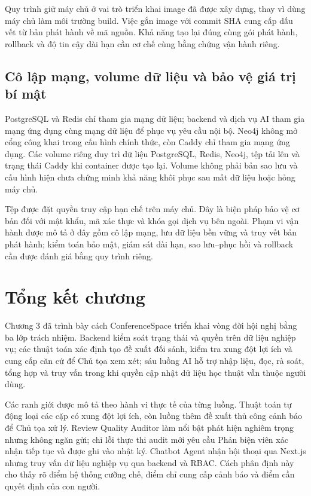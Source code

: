 Quy trình giữ máy chủ ở vai trò triển khai image đã được xây dựng, thay vì dùng máy chủ làm môi trường build. Việc gắn image với commit SHA cung cấp dấu vết từ bản phát hành về mã nguồn. Khả năng tạo lại đúng cùng gói phát hành, rollback và độ tin cậy dài hạn cần cơ chế cùng bằng chứng vận hành riêng.

\subsection{Cô lập mạng, volume dữ liệu và bảo vệ giá trị bí mật}

PostgreSQL và Redis chỉ tham gia mạng dữ liệu; backend và dịch vụ AI tham gia mạng ứng dụng cùng mạng dữ liệu để phục vụ yêu cầu nội bộ. Neo4j không mở cổng công khai trong cấu hình chính thức, còn Caddy chỉ tham gia mạng ứng dụng. Các volume riêng duy trì dữ liệu PostgreSQL, Redis, Neo4j, tệp tải lên và trạng thái Caddy khi container được tạo lại. Volume không phải bản sao lưu và cấu hình hiện chưa chứng minh khả năng khôi phục sau mất dữ liệu hoặc hỏng máy chủ.

Tệp  được đặt quyền truy cập hạn chế trên máy chủ. Đây là biện pháp bảo vệ cơ bản đối với mật khẩu, mã xác thực và khóa gọi dịch vụ bên ngoài. Phạm vi vận hành được mô tả ở đây gồm cô lập mạng, lưu dữ liệu bền vững và truy vết bản phát hành; kiểm toán bảo mật, giám sát dài hạn, sao lưu--phục hồi và rollback cần được đánh giá bằng quy trình riêng.

\section{Tổng kết chương}

Chương 3 đã trình bày cách ConferenceSpace triển khai vòng đời hội nghị bằng ba lớp trách nhiệm. Backend kiểm soát trạng thái và quyền trên dữ liệu nghiệp vụ; các thuật toán xác định tạo đề xuất đối sánh, kiểm tra xung đột lợi ích và cung cấp căn cứ để Chủ tọa xem xét; sáu luồng AI hỗ trợ nhập liệu, đọc, rà soát, tổng hợp và truy vấn trong khi quyền cập nhật dữ liệu học thuật vẫn thuộc người dùng.

Các ranh giới được mô tả theo hành vi thực tế của từng luồng. Thuật toán tự động loại các cặp có xung đột lợi ích, còn luồng thêm đề xuất thủ công cảnh báo để Chủ tọa xử lý. Review Quality Auditor làm nổi bật phát hiện nghiêm trọng nhưng không ngăn gửi; chỉ lỗi thực thi audit mới yêu cầu Phản biện viên xác nhận tiếp tục và được ghi vào nhật ký. Chatbot Agent nhận hội thoại qua Next.js nhưng truy vấn dữ liệu nghiệp vụ qua backend và RBAC. Cách phân định này cho thấy rõ điểm hệ thống cưỡng chế, điểm chỉ cung cấp cảnh báo và điểm cần quyết định của con người.

